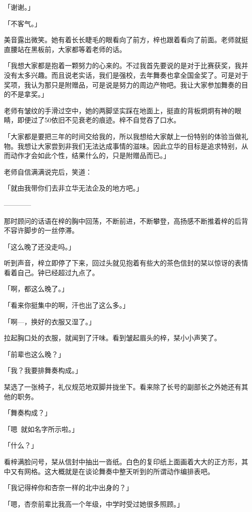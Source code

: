 \documentclass[UTF8]{ctexart}
\begin{document}
    「谢谢。」

    「不客气。」

    美音露出微笑。她有着长长睫毛的眼看向了前方，梓也跟着看向了前面。老师就挺直腰站在黑板前，大家都等着老师的话。

    「我想大家都是抱着一颗努力的心来的。不过我首先要说的是对于比赛获奖，我并没有太多兴趣。而且说老实话，我们是强校，去年舞奏也拿全国金奖了。可是对于奖项，我认为那只是附赠品，可是说是努力的周边产物吧。我让大家参加舞奏的目的不是拿奖。」

    老师有皱纹的手滑过空中，她的两脚坚实踩在地面上，挺直的背板炯炯有神的眼睛，即便过了50依旧不见衰老的痕迹。梓不自觉吞了口水。

    「大家都是要把三年的时间交给我的，所以我想给大家献上一份特别的体验当做礼物。我想让大家尝到非我们无法达成事情的滋味。因此立华的目标是追求特别，从而动作才会如此个性，结果什么的，只是附赠品而已。」

    老师自信满满说完后，笑道：

    「就由我带你们去非立华无法企及的地方吧。」

    ————

    那时顾问的话语在梓的胸中回荡，不断前进，不断攀登，高扬感不断推着梓的后背不容许脚步的一丝停滞。

    「这么晚了还没走吗。」

    听到声音，梓立即停了下来，回过头就见抱着有些大的茶色信封的栞以惊讶的表情看着自己。钟已经超过九点了。

    「啊，都这么晚了。」

    「看来你挺集中的啊，汗也出了这么多。」

    「啊—，换好的衣服又湿了。」

    拉起胸口处的衣服，就闻到了汗味。看到皱起眉头的梓，栞小小声笑了。

    「前辈也这么晚？」

    「我？我要排舞奏构成。」

    栞选了一张椅子，礼仪规范地双脚并拢坐下。看来除了长号的副部长之外她还有其他的职务。

    「舞奏构成？」

    「嗯~就如名字所示啦。」

    「什么？」

    看梓满脸问号，栞从信封中抽出一沓纸。白色的复印纸上面画着大大的正方形，其中又有网格。这大概就是在谈论舞奏中整天听到的所谓动作编排表吧。

    「我记得梓你和杏奈一样的北中出身的？」

    「嗯，杏奈前辈比我高一个年级，中学时受过她很多照顾。」
\end{document}
